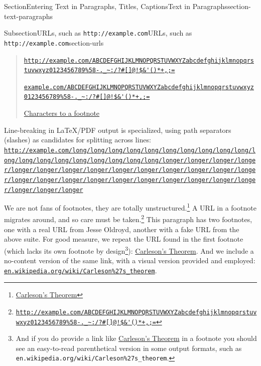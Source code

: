 \documentclass[twoside,10pt,]{article}
\newcommand{\mono}[1]{\texttt{#1}}
\numberwithin{equation}{section}
\begin{document}
\begin{sectionptx}{Section}{Entering Text in Paragraphs, Titles, Captions}{}{Text in Paragraphs}{}{}{section-text-paragraphs}
\begin{subsectionptx}{Subsection}{URLs, such as \mono{http://example.com}}{}{URLs, such as \mono{http://example.com}}{}{}{section-urls}
\begin{quote}
\href{http://example.com/ABCDEFGHIJKLMNOPQRSTUVWXYZabcdefghijklmnopqrstuvwxyz0123456789\%58-._\~:/?\#[]@!$\&'()*+,;=}{\nolinkurl{http://example.com/ABCDEFGHIJKLMNOPQRSTUVWXYZabcdefghijklmnopqrstuvwxyz0123456789\%58-._\~:/?\#[]@!$\&'()*+,;=}}%
\par
\href{http://example.com/ABCDEFGHIJKLMNOPQRSTUVWXYZabcdefghijklmnopqrstuvwxyz0123456789\%58-._\~:/?\#[]@!$\&'()*+,;=}{\nolinkurl{example.com/ABCDEFGHIJKLMNOPQRSTUVWXYZabcdefghijklmnopqrstuvwxyz0123456789\%58-._\~:/?\#[]@!$\&'()*+,;=}}%
\par
\href{http://example.com/ABCDEFGHIJKLMNOPQRSTUVWXYZabcdefghijklmnopqrstuvwxyz0123456789\%58-._\~:/?\#[]@!$\&'()*+,;=}{Characters to a footnote}%
\end{quote}
Line-breaking in \LaTeX{}\slash{}PDF output is specialized, using path separators (slashes) as candidates for splitting across lines: \href{http://example.com/long/long/long/long/long/long/long/long/long/long/long/long/long/long/long/long/long/long/long/longer/longer/longer/longer/longer/longer/longer/longer/longer/longer/longer/longer/longer/longer/longer/longer/longer/longer/longer/longer/longer/longer/longer/longer/longer/longer/longer}{\nolinkurl{http://example.com/long/long/long/long/long/long/long/long/long/long/long/long/long/long/long/long/long/long/long/longer/longer/longer/longer/longer/longer/longer/longer/longer/longer/longer/longer/longer/longer/longer/longer/longer/longer/longer/longer/longer/longer/longer/longer/longer/longer/longer}}%
\par
We are not fans of footnotes, they are totally unstructured.\footnote{\href{https://en.wikipedia.org/wiki/Carleson\%27s_theorem}{Carleson's Theorem}\label{section-urls-10-1}} A URL in a footnote migrates around, and so care must be taken.\footnote{\href{http://example.com/ABCDEFGHIJKLMNOPQRSTUVWXYZabcdefghijklmnopqrstuvwxyz0123456789\%58-._\~:/?\#[]@!$\&'()*+,;=}{\nolinkurl{http://example.com/ABCDEFGHIJKLMNOPQRSTUVWXYZabcdefghijklmnopqrstuvwxyz0123456789\%58-._\~:/?\#[]@!$\&'()*+,;=}}\label{section-urls-10-2}} This paragraph has two footnotes, one with a real URL from Jesse Oldroyd, another with a fake URL from the above suite. For good measure, we repeat the URL found in the first footnote (which lacks its own footnote by design\footnote{And if you do provide a link like \href{https://en.wikipedia.org/wiki/Carleson\%27s_theorem}{Carleson's Theorem} in a footnote you should see an  easy-to-read parenthetical version in some output formats, such as \mono{en.wikipedia.org/wiki/Carleson\%27s\_theorem}.\label{section-urls-10-3}}): \href{https://en.wikipedia.org/wiki/Carleson\%27s_theorem}{Carleson's Theorem}. And we include a no-content version of the same link, with a visual version provided and employed: \href{https://en.wikipedia.org/wiki/Carleson\%27s_theorem}{\nolinkurl{en.wikipedia.org/wiki/Carleson\%27s_theorem}}.%

\end{subsectionptx}
\end{sectionptx}
\end{document}
